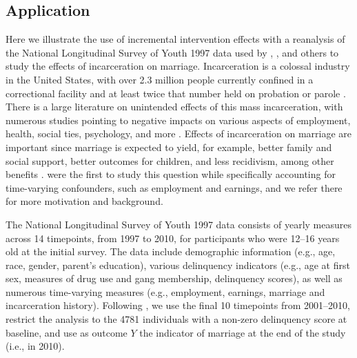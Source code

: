 \documentclass[12pt]{article}
\theoremstyle{remark}
\begin{document}
\subsection{Application}
\label{sec:app}

Here we illustrate the use of incremental intervention effects with a reanalysis of the National Longitudinal Survey of Youth 1997 data used by \textcite{huebner2005effect}, \textcite{bacak2015marginal}, and others to study the effects of incarceration on marriage. Incarceration is a colossal industry in the United States, with over 2.3 million people currently confined in a correctional facility and at least twice that number held on probation or parole \autocite{wagner2016mass}. There is a large literature on unintended effects of this mass incarceration, with numerous studies pointing to negative impacts on various aspects of employment, health, social ties, psychology, and more \autocite{pattillo2004imprisoning, clear2009imprisoning}. Effects of incarceration on marriage are important since marriage is expected to yield, for example, better family and social support, better outcomes for children, and less recidivism, among other benefits \autocite{huebner2005effect, clear2009imprisoning}. \textcite{bacak2015marginal} were the first to study this question while specifically accounting for time-varying confounders, such as employment and earnings, and we refer there for more motivation and background.

The National Longitudinal Survey of Youth 1997 data consists of yearly measures across 14 timepoints, from 1997 to 2010, for participants who were 12--16 years old at the initial survey. The data include demographic information (e.g., age, race, gender, parent's education), various delinquency indicators (e.g., age at first sex, measures of drug use and gang membership, delinquency scores), as well as numerous time-varying measures (e.g., employment, earnings, marriage and incarceration history). Following \textcite{bacak2015marginal}, we use the final 10 timepoints from 2001--2010, restrict the analysis to the 4781 individuals with a non-zero delinquency score at baseline, and use as outcome $Y$ the indicator of marriage at the end of the study (i.e., in 2010).
\end{document}
